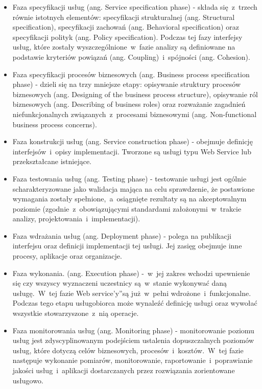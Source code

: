 \begin{itemize}
\item{Faza specyfikacji usług (ang. Service specification phase) - składa się~z~trzech równie istotnych elementów: specyfikacji strukturalnej (ang. Structural specification), specyfikacji zachowań (ang. Behavioral specification) oraz specyfikacji polityk (ang. Policy specification). Podczas tej fazy  interfejsy usług, które zostały wyszczególnione~w~fazie analizy są definiowane na podstawie kryteriów powiązań (ang. Coupling)~i~spójności (ang. Cohesion).}

\item{Faza specyfikacji procesów biznesowych (ang. Business process specification phase) - dzieli się na trzy mniejsze etapy: opisywanie struktury procesów biznesowych (ang. Designing of the business process structure), opisywanie ról biznesowych (ang. Describing of business roles) oraz rozważanie zagadnień niefunkcjonalnych związanych~z~procesami biznesowymi (ang. Non-functional business process concerns).}

\item{Faza konstrukcji usług (ang. Service construction phase) - obejmuje definicję interfejsów~i~opisy implementacji. Tworzone są usługi typu Web Service lub przekształcane istniejące.}

\item{Faza testowania usług (ang. Testing phase) - testowanie usługi jest ogólnie scharakteryzowane jako walidacja mająca na celu sprawdzenie, że postawione wymagania zostały spełnione,~a~osiągnięte rezultaty są na akceptowalnym poziomie (zgodnie~z~obowiązującymi standardami założonymi~w~trakcie analizy, projektowania~i~implementacji).} 

\item{Faza wdrażania usług (ang. Deployment phase) - polega na publikacji interfejsu oraz definicji implementacji tej usługi. Jej zasięg obejmuje inne procesy, aplikacje oraz organizacje.}

\item{Faza wykonania. (ang. Execution phase) -~w~jej zakres wchodzi upewnienie się czy wszyscy wyznaczeni uczestnicy są~w~stanie wykonywać daną usługę.~W~tej fazie \quotedblbase Web service'y\textquotedblright są już~w~pełni wdrożone~i~funkcjonalne. Podczas tego etapu usługobiorca może wynaleźć definicję usługi oraz wywołać wszystkie stowarzyszone~z~nią operacje.}

\item{Faza monitorowania usług (ang. Monitoring phase) - monitorowanie poziomu usług jest zdyscyplinowanym podejściem ustalenia dopuszczalnych poziomów usług, które dotyczą celów biznesowych, procesów~i~kosztów.~W~tej fazie następuje wykonanie pomiarów, monitorowanie, raportowanie~i~poprawianie jakości usług~i~aplikacji dostarczanych przez rozwiązania zorientowane usługowo. \cite{PapaZog}}
\end{itemize}

